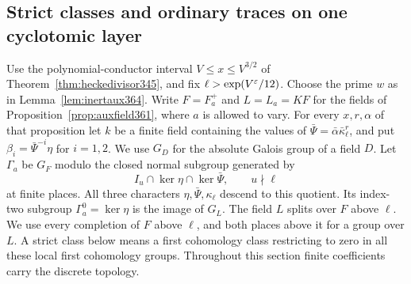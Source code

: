 \documentclass[a4paper,11pt]{article}
\theoremstyle{definition}
\theoremstyle{remark}
\numberwithin{equation}{section}
\begin{document}
\subsection{Strict classes and ordinary traces on one cyclotomic layer}
\label{sec:commonframe365}

Use the polynomial-conductor interval \(V\le x\le V^{3/2}\)
of Theorem~\ref{thm:heckedivisor345}, and fix
\(\ell>\exp(V^\varepsilon/12)\). Choose the prime \(w\) as in
Lemma~\ref{lem:inertaux364}. Write \(F=F_a^+\) and \(L=L_a=KF\)
for the fields of Proposition~\ref{prop:auxfield361}, where \(a\)
is allowed to vary. For every \(x,r,\alpha\) of that proposition
let \(k\) be a finite field containing the values of
\(\bar\Psi=\bar\alpha\bar\kappa_\ell^r\), and put
\(\beta_i=\bar\Psi^{-i}\eta\) for \(i=1,2\).
We use \(G_D\) for the absolute Galois group of a field \(D\).
Let \(\Gamma_a\) be \(G_F\) modulo the closed normal subgroup
generated by
\[
       I_u\cap\ker\eta\cap\ker\bar\Psi,\qquad u\nmid\ell
\]
at finite places. All three characters
\(\eta,\bar\Psi,\kappa_\ell\) descend to this quotient.
Its index-two subgroup \(\Gamma_a^0=\ker\eta\) is the image
of \(G_L\). The field \(L\) splits over \(F\) above \(\ell\).
We use every completion of \(F\) above \(\ell\), and both places
above it for a group over \(L\). A strict class below means
a first cohomology class restricting to zero in all these
local first cohomology groups. Throughout this section finite
coefficients carry the discrete topology.
\end{document}
